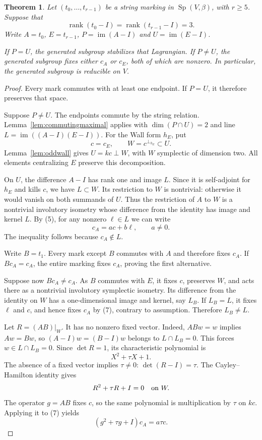 \documentclass[11pt]{article}
\newtheorem{theorem}{Theorem}
\newcommand{\im}{\operatorname{im}}
\newcommand{\Sp}{\operatorname{Sp}}
\begin{document}
\begin{theorem}\label{thm:maximal}
Let \((t_0,\ldots,t_{r-1})\) be a string marking in
\(\Sp(V,\beta)\), with \(r\geq5\). Suppose that
\[
       \operatorname{rank}(t_0-I)
        =\operatorname{rank}(t_{r-1}-I)=3.              \tag{6}
\]
Write \(A=t_0\), \(E=t_{r-1}\), \(P=\im(A-I)\) and
\(U=\im(E-I)\).

If \(P=U\), the generated subgroup stabilizes that Lagrangian.
If \(P\ne U\), the generated subgroup fixes either \(c_A\)
or \(c_E\), both of which are nonzero.
In particular, the generated subgroup is reducible on \(V\).
\end{theorem}
\begin{proof}
Every mark commutes with at least one endpoint. If \(P=U\), it
therefore preserves that space.

Suppose \(P\ne U\). The endpoints commute by the string relation.
Lemma~\ref{lem:commutingmaximal} applies with \(\dim(P\cap U)=2\)
and line \(L=\im((A-I)(E-I))\). For the Wall form \(h_E\), put
\[
              c=c_E,\qquad W=c^{\perp_{h_E}}\subset U.
\]
Lemma~\ref{lem:oddwall} gives \(U=kc\perp W\), with \(W\)
symplectic of dimension two.
All elements centralizing \(E\) preserve this decomposition.

On \(U\), the difference \(A-I\) has rank one and image \(L\).
Since it is self-adjoint for \(h_E\) and kills \(c\), we have
\(L\subset W\). Its restriction to \(W\) is nontrivial: otherwise
it would vanish on both summands of \(U\).
Thus the restriction of \(A\) to \(W\) is a nontrivial
involutory isometry whose difference from the identity has image
and kernel \(L\).
By (5), for any nonzero \(\ell\in L\) we can write
\[
                       c_A=a c+b\ell,\qquad a\ne0.     \tag{7}
\]
The inequality follows because \(c_A\notin L\).

Write \(B=t_1\). Every mark except \(B\) commutes with \(A\)
and therefore fixes \(c_A\).
If \(Bc_A=c_A\), the entire marking fixes \(c_A\), proving
the first alternative.

Suppose now \(Bc_A\ne c_A\). As \(B\) commutes with \(E\),
it fixes \(c\), preserves \(W\), and acts there as a
nontrivial involutory symplectic isometry.
Its difference from the identity on \(W\) has a one-dimensional
image and kernel, say \(L_B\).
If \(L_B=L\), it fixes \(\ell\) and \(c\), and hence fixes \(c_A\)
by (7), contrary to assumption. Therefore \(L_B\ne L\).

Let \(R=(AB)|_W\). It has no nonzero fixed vector.
Indeed, \(ABw=w\) implies \(Aw=Bw\), so
\((A-I)w=(B-I)w\) belongs to \(L\cap L_B=0\).
This forces \(w\in L\cap L_B=0\).
Since \(\det R=1\), its characteristic polynomial is
\[
                        X^2+\tau X+1.
\]
The absence of a fixed vector implies \(\tau\ne0\):
\(\det(R-I)=\tau\).
The Cayley--Hamilton identity gives
\[
                    R^2+\tau R+I=0\quad\hbox{on }W.
\]
The operator \(g=AB\) fixes \(c\), so the same polynomial is
multiplication by \(\tau\) on \(kc\). Applying it to (7) yields
\[
               (g^2+\tau g+I)c_A=a\tau c.             \tag{8}
\]


\end{proof}
\end{document}
